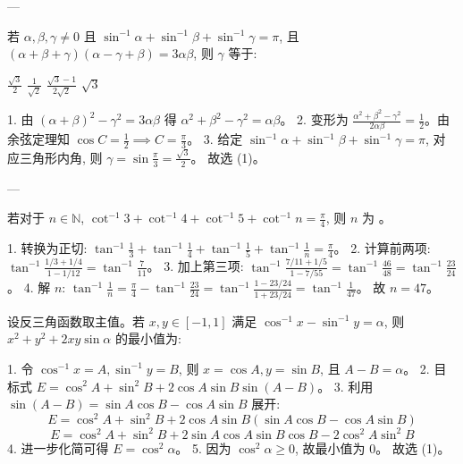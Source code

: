 \begin{questions}
---

\question
若 $\alpha, \beta, \gamma \neq 0$ 且 $\sin^{-1}\alpha + \sin^{-1}\beta + \sin^{-1}\gamma = \pi$, 且 $(\alpha + \beta + \gamma)(\alpha - \gamma + \beta) = 3\alpha\beta$, 则 $\gamma$ 等于:
\begin{choices}
    \choice $\frac{\sqrt{3}}{2}$ \choice $\frac{1}{\sqrt{2}}$ \choice $\frac{\sqrt{3}-1}{2\sqrt{2}}$ \choice $\sqrt{3}$
\end{choices}

\begin{solution}
1. 由 $(\alpha+\beta)^2 - \gamma^2 = 3\alpha\beta$ 得 $\alpha^2 + \beta^2 - \gamma^2 = \alpha\beta$。
2. 变形为 $\frac{\alpha^2+\beta^2-\gamma^2}{2\alpha\beta} = \frac{1}{2}$。由余弦定理知 $\cos C = \frac{1}{2} \implies C = \frac{\pi}{3}$。
3. 给定 $\sin^{-1}\alpha + \sin^{-1}\beta + \sin^{-1}\gamma = \pi$, 对应三角形内角, 则 $\gamma = \sin\frac{\pi}{3} = \frac{\sqrt{3}}{2}$。
故选 (1)。
\end{solution}

---

\question
若对于 $n \in \mathbb{N}$, $\cot^{-1}3 + \cot^{-1}4 + \cot^{-1}5 + \cot^{-1}n = \frac{\pi}{4}$, 则 $n$ 为 \underline{\quad}。

\begin{solution}
1. 转换为正切: $\tan^{-1}\frac{1}{3} + \tan^{-1}\frac{1}{4} + \tan^{-1}\frac{1}{5} + \tan^{-1}\frac{1}{n} = \frac{\pi}{4}$。
2. 计算前两项: $\tan^{-1}\frac{1/3+1/4}{1-1/12} = \tan^{-1}\frac{7}{11}$。
3. 加上第三项: $\tan^{-1}\frac{7/11+1/5}{1-7/55} = \tan^{-1}\frac{46}{48} = \tan^{-1}\frac{23}{24}$。
4. 解 $n$: $\tan^{-1}\frac{1}{n} = \frac{\pi}{4} - \tan^{-1}\frac{23}{24} = \tan^{-1}\frac{1-23/24}{1+23/24} = \tan^{-1}\frac{1}{47}$。
故 $n = 47$。
\end{solution}

\question
设反三角函数取主值。若 $x, y \in [-1, 1]$ 满足 $\cos^{-1} x - \sin^{-1} y = \alpha$, 则 $x^2 + y^2 + 2xy\sin\alpha$ 的最小值为:

\begin{solution}
1. 令 $\cos^{-1} x = A, \sin^{-1} y = B$, 则 $x = \cos A, y = \sin B$, 且 $A - B = \alpha$。
2. 目标式 $E = \cos^2 A + \sin^2 B + 2\cos A \sin B \sin(A-B)$。
3. 利用 $\sin(A-B) = \sin A \cos B - \cos A \sin B$ 展开:
\[ E = \cos^2 A + \sin^2 B + 2\cos A \sin B (\sin A \cos B - \cos A \sin B) \]
\[ E = \cos^2 A + \sin^2 B + 2\sin A \cos A \sin B \cos B - 2\cos^2 A \sin^2 B \]
4. 进一步化简可得 $E = \cos^2 \alpha$。
5. 因为 $\cos^2 \alpha \ge 0$, 故最小值为 0。
故选 (1)。
\end{solution}


\end{questions}
